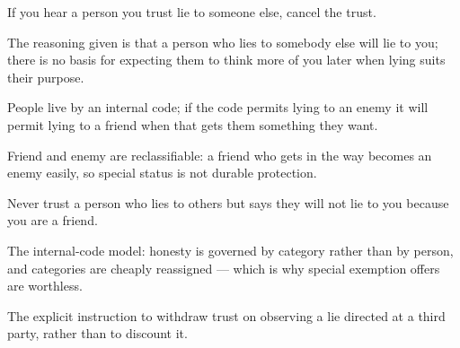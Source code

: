 

\begin{distilled}
  \item If you hear a person you trust lie to someone else, cancel the trust.
  \item The reasoning given is that a person who lies to somebody else will lie to you; there is no basis for expecting them to think more of you later when lying suits their purpose.
  \item People live by an internal code; if the code permits lying to an enemy it will permit lying to a friend when that gets them something they want.
  \item Friend and enemy are reclassifiable: a friend who gets in the way becomes an enemy easily, so special status is not durable protection.
  \item Never trust a person who lies to others but says they will not lie to you because you are a friend.
\end{distilled}

\begin{unique}
  \item The internal-code model: honesty is governed by category rather than by person, and categories are cheaply reassigned --- which is why special exemption offers are worthless.
  \item The explicit instruction to withdraw trust on observing a lie directed at a third party, rather than to discount it.
\end{unique}
